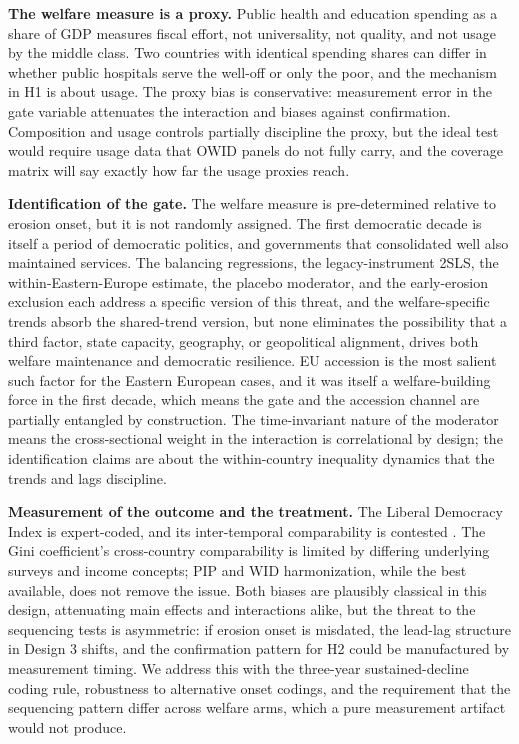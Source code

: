 \documentclass[11pt,letterpaper]{article}
\begin{document}
\textbf{The welfare measure is a proxy.} Public health and education spending as a share of GDP measures fiscal effort, not universality, not quality, and not usage by the middle class. Two countries with identical spending shares can differ in whether public hospitals serve the well-off or only the poor, and the mechanism in H1 is about usage. The proxy bias is conservative: measurement error in the gate variable attenuates the interaction and biases against confirmation. Composition and usage controls partially discipline the proxy, but the ideal test would require usage data that OWID panels do not fully carry, and the coverage matrix will say exactly how far the usage proxies reach.

\textbf{Identification of the gate.} The welfare measure is pre-determined relative to erosion onset, but it is not randomly assigned. The first democratic decade is itself a period of democratic politics, and governments that consolidated well also maintained services. The balancing regressions, the legacy-instrument 2SLS, the within-Eastern-Europe estimate, the placebo moderator, and the early-erosion exclusion each address a specific version of this threat, and the welfare-specific trends absorb the shared-trend version, but none eliminates the possibility that a third factor, state capacity, geography, or geopolitical alignment, drives both welfare maintenance and democratic resilience. EU accession is the most salient such factor for the Eastern European cases, and it was itself a welfare-building force in the first decade, which means the gate and the accession channel are partially entangled by construction. The time-invariant nature of the moderator means the cross-sectional weight in the interaction is correlational by design; the identification claims are about the within-country inequality dynamics that the trends and lags discipline.

\textbf{Measurement of the outcome and the treatment.} The Liberal Democracy Index is expert-coded, and its inter-temporal comparability is contested \citep{WaldnerLust2018}. The Gini coefficient's cross-country comparability is limited by differing underlying surveys and income concepts; PIP and WID harmonization, while the best available, does not remove the issue. Both biases are plausibly classical in this design, attenuating main effects and interactions alike, but the threat to the sequencing tests is asymmetric: if erosion onset is misdated, the lead-lag structure in Design 3 shifts, and the confirmation pattern for H2 could be manufactured by measurement timing. We address this with the three-year sustained-decline coding rule, robustness to alternative onset codings, and the requirement that the sequencing pattern differ across welfare arms, which a pure measurement artifact would not produce.
\end{document}
